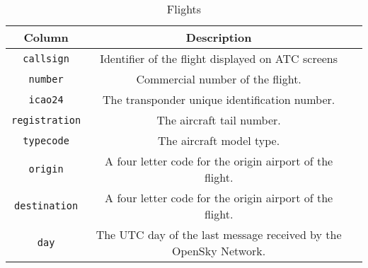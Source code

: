 \documentclass[sigconf, nonacm]{acmart}
\begin{document}
\begin{table*}
  \caption{Flights}
  \label{tab:commands}
  \begin{tabular}{ccl}
    \toprule
    Column & Description\\
    \midrule
    \texttt{callsign} & Identifier of the flight displayed on ATC screens\\
    \texttt{number} & Commercial number of the flight.\\
    \texttt{icao24} & The transponder unique identification number.\\
    \texttt{registration} & The aircraft tail number.\\
    \texttt{typecode} & The aircraft model type.\\
    \texttt{origin} & A four letter code for the origin airport of the flight.\\
    \texttt{destination} & A four letter code for the origin airport of the flight.\\
    \texttt{day} & The UTC day of the last message received by the OpenSky Network.\\
    \bottomrule
  \end{tabular}
\end{table*}



\end{document}
